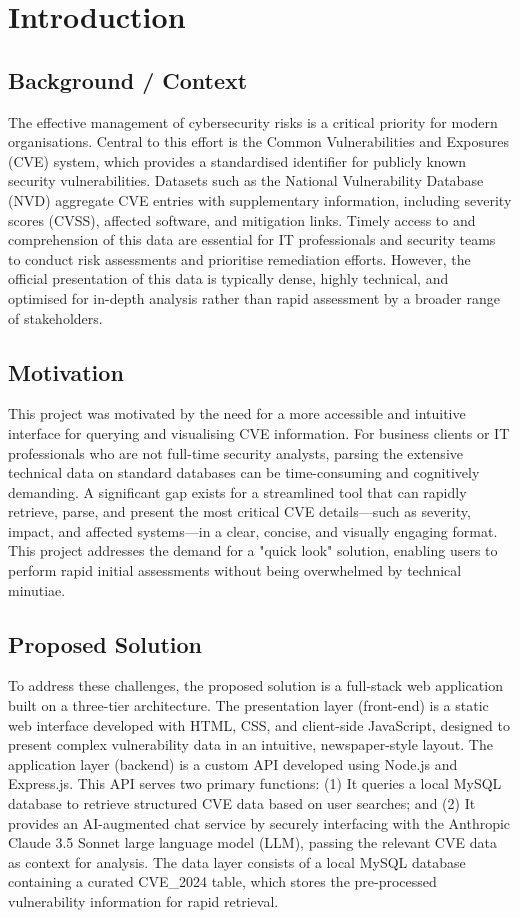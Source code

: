 \documentclass[12pt,a4paper]{article}
\begin{document}
    \section{Introduction}
    \subsection{Background / Context}
    The effective management of cybersecurity risks is a critical priority for modern organisations. Central to this effort is the Common Vulnerabilities and Exposures (CVE) system, which provides a standardised identifier for publicly known security vulnerabilities. Datasets such as the National Vulnerability Database (NVD) aggregate CVE entries with supplementary information, including severity scores (CVSS), affected software, and mitigation links. Timely access to and comprehension of this data are essential for IT professionals and security teams to conduct risk assessments and prioritise remediation efforts. However, the official presentation of this data is typically dense, highly technical, and optimised for in-depth analysis rather than rapid assessment by a broader range of stakeholders.
    \subsection{Motivation}
    This project was motivated by the need for a more accessible and intuitive interface for querying and visualising CVE information. For business clients or IT professionals who are not full-time security analysts, parsing the extensive technical data on standard databases can be time-consuming and cognitively demanding. A significant gap exists for a streamlined tool that can rapidly retrieve, parse, and present the most critical CVE details—such as severity, impact, and affected systems—in a clear, concise, and visually engaging format. This project addresses the demand for a "quick look" solution, enabling users to perform rapid initial assessments without being overwhelmed by technical minutiae.
    \subsection{Proposed Solution}
    To address these challenges, the proposed solution is a full-stack web application built on a three-tier architecture. The presentation layer (front-end) is a static web interface developed with HTML, CSS, and client-side JavaScript, designed to present complex vulnerability data in an intuitive, newspaper-style layout. The application layer (backend) is a custom API developed using Node.js and Express.js. This API serves two primary functions: (1) It queries a local MySQL database to retrieve structured CVE data based on user searches; and (2) It provides an AI-augmented chat service by securely interfacing with the Anthropic Claude 3.5 Sonnet large language model (LLM), passing the relevant CVE data as context for analysis. The data layer consists of a local MySQL database containing a curated CVE_2024 table, which stores the pre-processed vulnerability information for rapid retrieval.
    \clearpage
\end{document}
